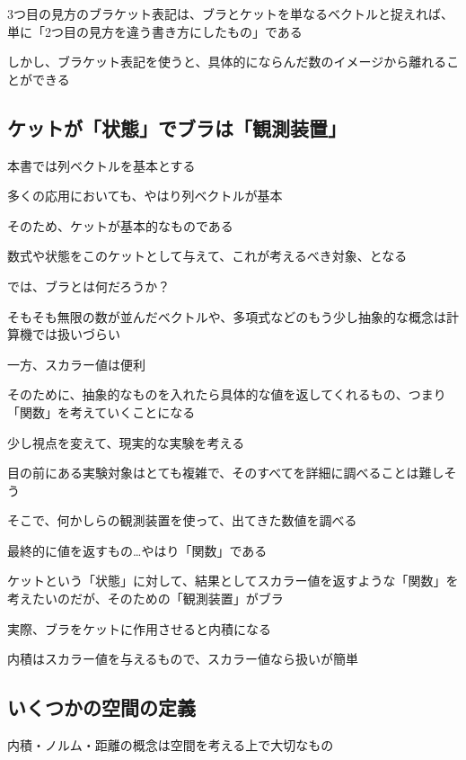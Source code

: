 \documentclass[../book_half_step_linear]{subfiles}
\begin{document}
\br

3つ目の見方のブラケット表記は、ブラとケットを単なるベクトルと捉えれば、単に「2つ目の見方を違う書き方にしたもの」である

しかし、ブラケット表記を使うと、具体的にならんだ数のイメージから離れることができる

\sectionline
\subsection{ケットが「状態」でブラは「観測装置」}

本書では列ベクトルを基本とする

多くの応用においても、やはり列ベクトルが基本

そのため、ケットが基本的なものである

数式や状態をこのケットとして与えて、これが考えるべき対象、となる

\br

では、ブラとは何だろうか？

\br

そもそも無限の数が並んだベクトルや、多項式などのもう少し抽象的な概念は計算機では扱いづらい

一方、スカラー値は便利

そのために、抽象的なものを入れたら具体的な値を返してくれるもの、つまり「関数」を考えていくことになる

\br

少し視点を変えて、現実的な実験を考える

目の前にある実験対象はとても複雑で、そのすべてを詳細に調べることは難しそう

そこで、何かしらの観測装置を使って、出てきた数値を調べる

最終的に値を返すもの…やはり「関数」である

\br

ケットという「状態」に対して、結果としてスカラー値を返すような「関数」を考えたいのだが、そのための「観測装置」がブラ

実際、ブラをケットに作用させると内積になる

内積はスカラー値を与えるもので、スカラー値なら扱いが簡単

\sectionline
\subsection{いくつかの空間の定義}

内積・ノルム・距離の概念は空間を考える上で大切なもの

\br
\end{document}
